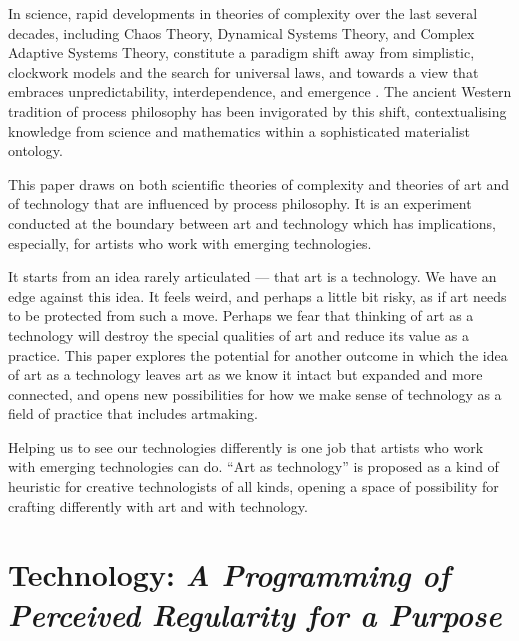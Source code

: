 \documentclass[letterpaper]{article}
\begin{document}
    
    In science, rapid developments in theories of complexity over the last several decades, including Chaos Theory, Dynamical Systems Theory, and Complex Adaptive Systems Theory, constitute a paradigm shift away from simplistic, clockwork models and the search for universal laws, and towards a view that embraces unpredictability, interdependence, and emergence \citep{StengersOrdrOtOfChs1984}. The ancient Western tradition of process philosophy \citep{SeibtStnfrdEncyclpdPrcssPhlsphy1974} has been invigorated by this shift, contextualising knowledge from science and mathematics within a sophisticated materialist ontology.
    
    This paper draws on both scientific theories of complexity and theories of art and of technology that are influenced by process philosophy. It is an experiment conducted at the boundary between art and technology which has implications, especially, for artists who work with emerging technologies.
    
    It starts from an idea rarely articulated \citep[pp.74-75]{SauvagnarguesArtmchns2016} — that art is a technology. We have an edge against this idea. It feels weird, and perhaps a little bit risky, as if art needs to be protected from such a move. Perhaps we fear that thinking of art as a technology will destroy the special qualities of art and reduce its value as a practice. This paper explores the potential for another outcome in which the idea of art as a technology leaves art as we know it intact but expanded and more connected, and opens new possibilities for how we make sense of technology as a field of practice that includes artmaking. 
    
    Helping us to see our technologies differently is one job that artists who work with emerging technologies can do. “Art as technology” is proposed as a kind of heuristic for creative technologists of all kinds, opening a space of possibility for crafting differently with art and with technology.

\section{Technology: \emph{A Programming of Perceived Regularity for a Purpose}} 
\end{document}
